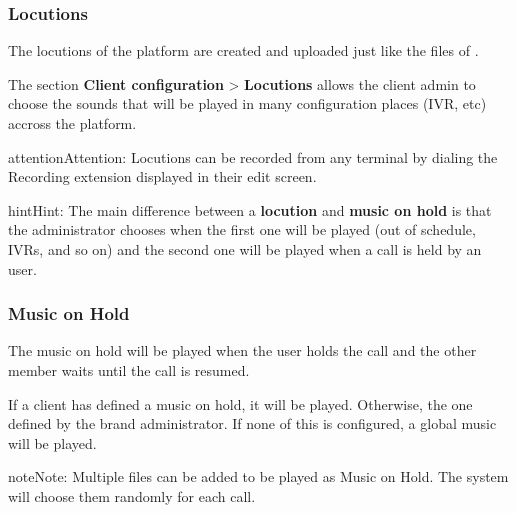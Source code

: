 \documentclass[letterpaper,10pt,english]{sphinxmanual}
\begin{document}
\subsubsection{Locutions}
\label{administration_portal/client/vpbx/multimedia/locutions:locutions}\label{administration_portal/client/vpbx/multimedia/locutions::doc}
The locutions of the platform are created and uploaded just like the files of
{\hyperref[administration_portal/client/vpbx/multimedia/music_on_hold:musiconhold]{}}.

The section \textbf{Client configuration} \textgreater{} \textbf{Locutions}  allows the client admin
to choose the sounds that will be played in many configuration places (IVR, etc)
accross the platform.

\begin{notice}{attention}{Attention:}
Locutions can be recorded from any terminal by dialing the
Recording extension displayed in their edit screen.
\end{notice}

\begin{notice}{hint}{Hint:}
The main difference between a \textbf{locution} and \textbf{music on hold} is
that the administrator chooses when the first one will be played (out of
schedule, IVRs, and so on) and the second one will be played when a call is
held by an user.
\end{notice}
\label{administration_portal/client/vpbx/multimedia/music_on_hold:musiconhold}

\subsubsection{Music on Hold}
\label{administration_portal/client/vpbx/multimedia/music_on_hold:music-on-hold}\label{administration_portal/client/vpbx/multimedia/music_on_hold::doc}\label{administration_portal/client/vpbx/multimedia/music_on_hold:musiconhold}\label{administration_portal/client/vpbx/multimedia/music_on_hold:id1}
The music on hold will be played when the user holds the call and the other
member waits until the call is resumed.

If a client has defined a music on hold, it will be played. Otherwise, the
one defined by the brand administrator. If none of this is configured, a global
music will be played.

\begin{notice}{note}{Note:}
Multiple files can be added to be played as Music on Hold. The system
will choose them randomly for each call.
\end{notice}
\end{document}
